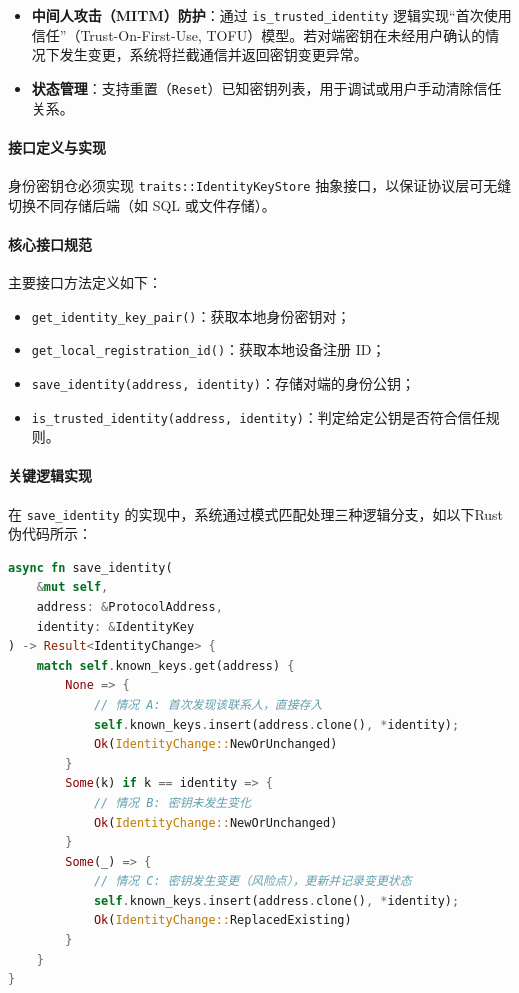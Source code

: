 \begin{itemize}
\begin{itemize}
    \item \textbf{中间人攻击（MITM）防护}：通过 \texttt{is\_trusted\_identity} 逻辑实现“首次使用信任”（Trust-On-First-Use, TOFU）模型。若对端密钥在未经用户确认的情况下发生变更，系统将拦截通信并返回密钥变更异常。
    
    \item \textbf{状态管理}：支持重置（\texttt{Reset}）已知密钥列表，用于调试或用户手动清除信任关系。
\end{itemize}

\paragraph{接口定义与实现}
\label{subsec:keystore_interface}

身份密钥仓必须实现 \texttt{traits::IdentityKeyStore} 抽象接口，以保证协议层可无缝切换不同存储后端（如 SQL 或文件存储）。

\paragraph{核心接口规范}
主要接口方法定义如下：
\begin{itemize}
    \item \texttt{get\_identity\_key\_pair()}：获取本地身份密钥对；
    \item \texttt{get\_local\_registration\_id()}：获取本地设备注册 ID；
    \item \texttt{save\_identity(address, identity)}：存储对端的身份公钥；
    \item \texttt{is\_trusted\_identity(address, identity)}：判定给定公钥是否符合信任规则。
\end{itemize}

\paragraph{关键逻辑实现}
在 \texttt{save\_identity} 的实现中，系统通过模式匹配处理三种逻辑分支，如以下Rust 伪代码所示：

\begin{lstlisting}[language=Rust, caption={\texttt{save\_identity} 逻辑实现}, label=lst:save_identity]
async fn save_identity(
    &mut self,
    address: &ProtocolAddress,
    identity: &IdentityKey
) -> Result<IdentityChange> {
    match self.known_keys.get(address) {
        None => {
            // 情况 A: 首次发现该联系人，直接存入
            self.known_keys.insert(address.clone(), *identity);
            Ok(IdentityChange::NewOrUnchanged)
        }
        Some(k) if k == identity => {
            // 情况 B: 密钥未发生变化
            Ok(IdentityChange::NewOrUnchanged)
        }
        Some(_) => {
            // 情况 C: 密钥发生变更（风险点），更新并记录变更状态
            self.known_keys.insert(address.clone(), *identity);
            Ok(IdentityChange::ReplacedExisting)
        }
    }
}
\end{lstlisting}


\end{itemize}
